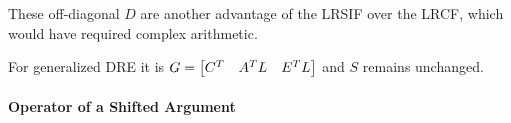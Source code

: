 \begin{remark}
  These off-diagonal $D$ are another advantage of the \ac{LRSIF} over the \ac{LRCF},
  which would have required complex arithmetic.
\end{remark}

\begin{remark}
  For generalized \ac{DRE} it is $G = \begin{bmatrix}
    C^T & A^T L & E^T L
  \end{bmatrix}$ and $S$ remains unchanged.
\end{remark}

\paragraph{\Riccati Operator of a Shifted Argument}

